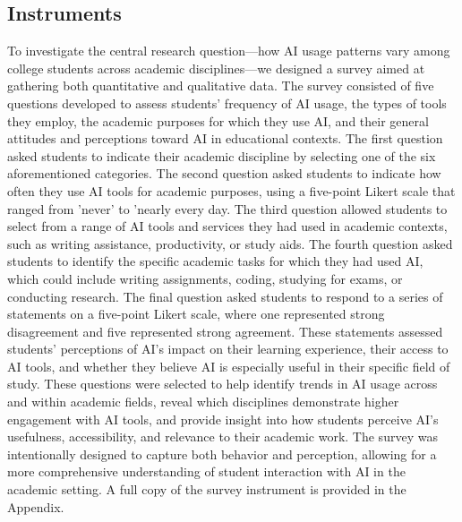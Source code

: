 \documentclass[12pt]{article}
\begin{document}
\subsection{Instruments}
\label{subsec:instruments}
To investigate the central research question—how AI usage patterns vary among college students across academic disciplines—we designed a survey aimed at gathering both quantitative and qualitative data. The survey consisted of five questions developed to assess students’ frequency of AI usage, the types of tools they employ, the academic purposes for which they use AI, and their general attitudes and perceptions toward AI in educational contexts.
The first question asked students to indicate their academic discipline by selecting one of the six aforementioned categories. The second question asked students to indicate how often they use AI tools for academic purposes, using a five-point Likert scale that ranged from 'never' to 'nearly every day. The third question allowed students to select from a range of AI tools and services they had used in academic contexts, such as writing assistance, productivity, or study aids. The fourth question asked students to identify the specific academic tasks for which they had used AI, which could include writing assignments, coding, studying for exams, or conducting research. The final question asked students to respond to a series of statements on a five-point Likert scale, where one represented strong disagreement and five represented strong agreement. These statements assessed students’ perceptions of AI’s impact on their learning experience, their access to AI tools, and whether they believe AI is especially useful in their specific field of study.
These questions were selected to help identify trends in AI usage across and within academic fields, reveal which disciplines demonstrate higher engagement with AI tools, and provide insight into how students perceive AI’s usefulness, accessibility, and relevance to their academic work. The survey was intentionally designed to capture both behavior and perception, allowing for a more comprehensive understanding of student interaction with AI in the academic setting. A full copy of the survey instrument is provided in the Appendix.
\end{document}
